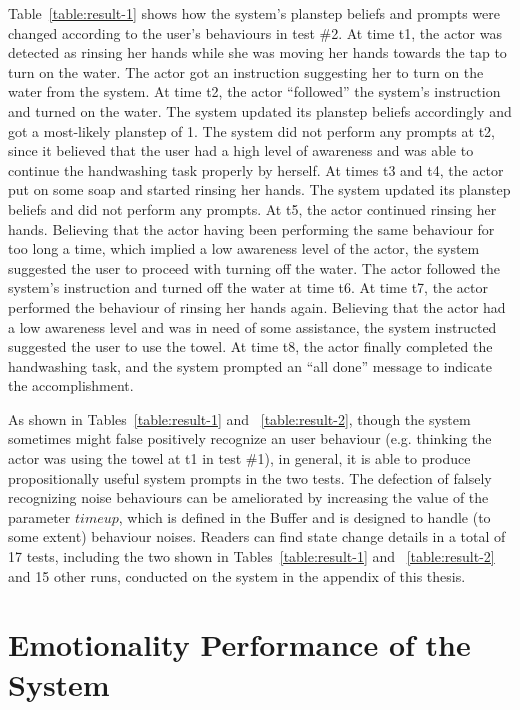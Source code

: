 Table~\ref{table:result-1} shows how the system's planstep beliefs and prompts were changed according to the user's behaviours in test \#2. At time t1, the actor was detected as rinsing her hands while she was moving her hands towards the tap to turn on the water. The actor got an instruction suggesting her to turn on the water from the system. At time t2, the actor ``followed'' the system's instruction and turned on the water. The system updated its planstep beliefs accordingly and got a most-likely planstep of 1. The system did not perform any prompts at t2, since it believed that the user had a high level of awareness and was able to continue the handwashing task properly by herself. At times t3 and t4, the actor put on some soap and started rinsing her hands. The system updated its planstep beliefs and did not perform any prompts. At t5, the actor continued rinsing her hands. Believing that the actor having been performing the same behaviour for too long a time, which implied a low awareness level of the actor, the system suggested the user to proceed with turning off the water. The actor followed the system's instruction and turned off the water at time t6. At time t7, the actor performed the behaviour of rinsing her hands again. Believing that the actor had a low awareness level and was in need of some assistance, the system instructed suggested the user to use the towel. At time t8, the actor finally completed the handwashing task, and the system prompted an ``all done'' message to indicate the accomplishment. 

As shown in Tables~\ref{table:result-1} and ~\ref{table:result-2}, though the system sometimes might false positively recognize an user behaviour (e.g. thinking the actor was using the towel at t1 in test \#1), in general, it is able to produce propositionally useful system prompts in the two tests. The defection of falsely recognizing noise behaviours can be ameliorated by increasing the value of the parameter $timeup$, which is defined in the Buffer and is designed to handle (to some extent) behaviour noises. Readers can find state change details in a total of 17 tests, including the two shown in Tables~\ref{table:result-1} and ~\ref{table:result-2} and 15 other runs, conducted on the system in the appendix of this thesis.


\section{Emotionality Performance of the System}

